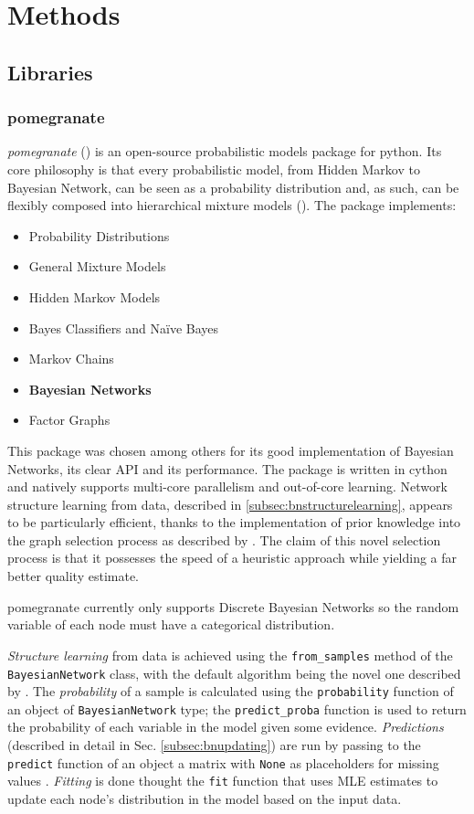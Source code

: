 
\section{Methods} 
\subsection{Libraries}
\subsubsection{pomegranate}
\textit{pomegranate} (\cite{pomegranate}) is an open-source probabilistic models package for python.
Its core philosophy is that every probabilistic model, from Hidden Markov to Bayesian Network, can be seen as a probability distribution and, as such, can be flexibly composed into hierarchical mixture models (\cite{Schreiber2017}).
The package implements:
\begin{itemize}
	\item Probability Distributions
	\item General Mixture Models
	\item Hidden Markov Models
	\item Bayes Classifiers and Na{\"i}ve Bayes
	\item Markov Chains
	\item \textbf{Bayesian Networks}
	\item Factor Graphs
\end{itemize} 

This package was chosen among others for its good implementation of Bayesian Networks, its clear API and its performance.
The package is written in cython and natively supports multi-core parallelism and out-of-core learning.
Network structure learning from data, described in \ref{subsec:bnstructurelearning}, appears to be particularly efficient, thanks to the implementation of prior knowledge into the graph selection process as described by \cite{schreiber_noble_2017}.
The claim of this novel selection process is that it possesses the speed of a heuristic approach while yielding a far better quality estimate.

pomegranate currently only supports Discrete Bayesian Networks so the random variable of each node must have a categorical distribution.

\textit{Structure learning} from data is achieved using the \texttt{from\_samples} method of the \texttt{BayesianNetwork} class, with the default algorithm being the novel one described by \cite{schreiber_noble_2017}.
The \textit{probability} of a sample is calculated using the \texttt{probability} function of an object of \texttt{BayesianNetwork} type; the \texttt{predict\_proba} function is used to return the probability of each variable in the model given some evidence.
\textit{Predictions} (described in detail in Sec. \ref{subsec:bnupdating}) are run by passing to the \texttt{predict} function of an object a matrix with \texttt{None} as placeholders for missing values .
\textit{Fitting} is done thought the \texttt{fit} function that uses MLE estimates to update each node's distribution in the model based on the input data.

